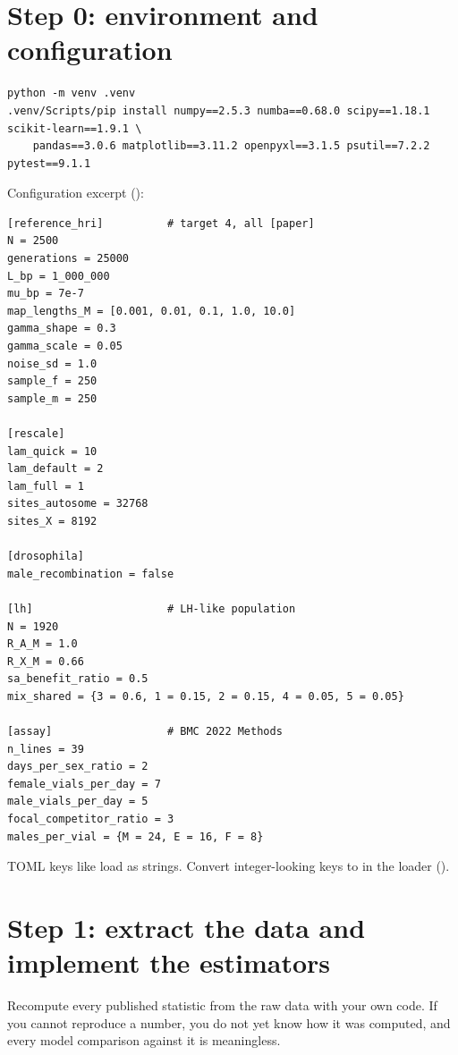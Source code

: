 \section{Step 0: environment and configuration}
\begin{lstlisting}[style=sh]
python -m venv .venv
.venv/Scripts/pip install numpy==2.5.3 numba==0.68.0 scipy==1.18.1 scikit-learn==1.9.1 \
    pandas==3.0.6 matplotlib==3.11.2 openpyxl==3.1.5 psutil==7.2.2 pytest==9.1.1
\end{lstlisting}
Configuration excerpt ():
\begin{lstlisting}[style=sh]
[reference_hri]          # target 4, all [paper]
N = 2500
generations = 25000
L_bp = 1_000_000
mu_bp = 7e-7
map_lengths_M = [0.001, 0.01, 0.1, 1.0, 10.0]
gamma_shape = 0.3
gamma_scale = 0.05
noise_sd = 1.0
sample_f = 250
sample_m = 250

[rescale]
lam_quick = 10
lam_default = 2
lam_full = 1
sites_autosome = 32768
sites_X = 8192

[drosophila]
male_recombination = false

[lh]                     # LH-like population
N = 1920
R_A_M = 1.0
R_X_M = 0.66
sa_benefit_ratio = 0.5
mix_shared = {3 = 0.6, 1 = 0.15, 2 = 0.15, 4 = 0.05, 5 = 0.05}

[assay]                  # BMC 2022 Methods
n_lines = 39
days_per_sex_ratio = 2
female_vials_per_day = 7
male_vials_per_day = 5
focal_competitor_ratio = 3
males_per_vial = {M = 24, E = 16, F = 8}
\end{lstlisting}
TOML keys like  load as strings. Convert integer-looking keys to  in the loader ().

\section{Step 1: extract the data and implement the estimators}
\begin{stepbox}
Recompute every published statistic from the raw data with your own code. If you cannot reproduce a number, you do not yet know how it was computed, and every model comparison against it is meaningless.
\end{stepbox}

